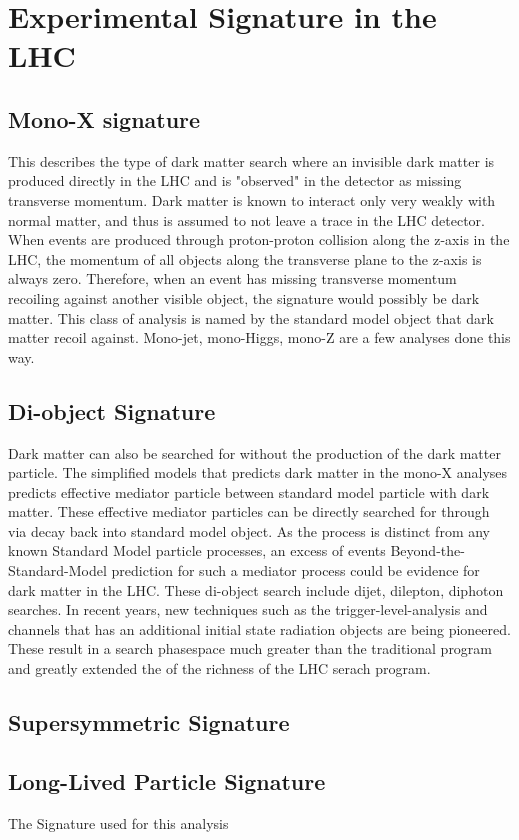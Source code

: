 \section{Experimental Signature in the LHC}
\label{section:signatures}

\subsection{Mono-X signature}
    This describes the type of dark matter search where an invisible dark matter is produced directly in the LHC and is "observed" in the detector as missing transverse momentum.
    Dark matter is known to interact only very weakly with normal matter, and thus is assumed to not leave a trace in the LHC detector. When events are produced through proton-proton collision along the z-axis in the LHC, the momentum of all objects along the transverse plane to the z-axis is always zero. Therefore, when an event has missing transverse momentum recoiling against another visible object, the signature would possibly be dark matter.
This class of analysis is named by the standard model object that dark matter recoil against. Mono-jet, mono-Higgs, mono-Z are a few analyses done this way. 

\subsection{Di-object Signature}
    Dark matter can also be searched for without the production of the dark matter particle. The simplified models that predicts dark matter in the mono-X analyses predicts effective mediator particle between standard model particle with dark matter. These effective mediator particles can be directly searched for through via decay back into standard model object. As the process is distinct from any known Standard Model particle processes, an excess of events Beyond-the-Standard-Model prediction for
    such a mediator process could be evidence for dark matter in the LHC. 
These di-object search include dijet, dilepton, diphoton searches. 
In recent years, new techniques such as the trigger-level-analysis and channels that has an additional initial state radiation objects are being pioneered. These result in a search phasespace much greater than the traditional program and greatly extended the of the richness of the LHC serach program.

\subsection{Supersymmetric Signature}	

\subsection{Long-Lived Particle Signature}


The Signature used for this analysis 
